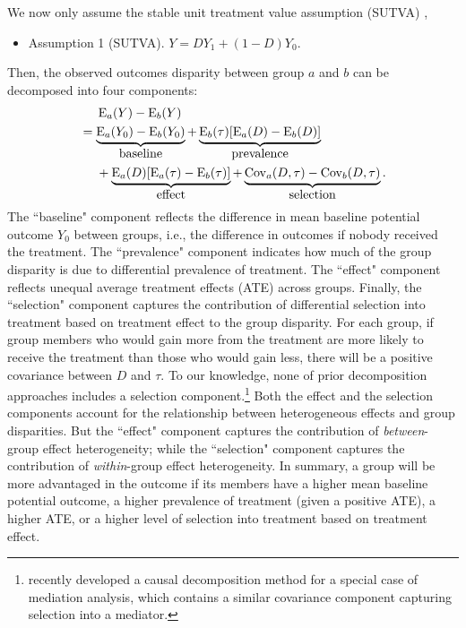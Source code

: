 \documentclass[12pt,a4paper]{article}
\newcommand{\Cov}{\operatorname{Cov}}
\newcommand{\E}{\operatorname{E}}
\begin{document}
We now only assume the stable unit treatment value assumption (SUTVA) \citep{rubin_randomization_1980}, 
\begin{itemize}
     \item[] Assumption 1 (SUTVA). $Y=D Y_1 + (1-D) Y_0$.
\end{itemize}
Then, the observed outcomes disparity between group $a$ and $b$ can be decomposed into four components: 
\begin{align}
&\phantom{{}={}} \E_a(Y)-\E_b(Y)   \nonumber  \\
&= \underbrace{ \E_a(Y_{0})-\E_b(Y_{0}) }_{\text{\normalsize baseline}}
+ \underbrace{\E_b(\tau) [\E_a(D)-\E_b(D)]}_{\text{\normalsize prevalence}} \nonumber  \\ 
&\phantom{{}={}} + \underbrace{\E_a(D)[ \E_a(\tau) - \E_b(\tau) ]}_{\text{\normalsize effect}} 
+ \underbrace{\Cov_a(D, \tau) -  \Cov_b(D, \tau)}_{\text{\normalsize  selection}}. \label{eqt1}
\end{align}
The ``baseline" component reflects the difference in mean baseline potential outcome $Y_0$ between groups, i.e., the difference in outcomes if nobody received the treatment. The ``prevalence" component indicates how much of the group disparity is due to differential prevalence of treatment. The ``effect" component reflects unequal average treatment effects (ATE) across groups. Finally, the ``selection" component captures the contribution of differential selection into treatment based on treatment effect to the group disparity. 
For each group, if group members who would gain more from the treatment are more likely to receive the treatment than those who would gain less, there will be a positive covariance between $D$ and $\tau$. To our knowledge, none of prior decomposition approaches includes a selection component.\footnote{\citet{zhou_attendance_2022} recently developed a causal decomposition method for a special case of mediation analysis, which contains a similar covariance component capturing selection into a mediator.} 
Both the effect and the selection components account for the relationship between heterogeneous effects and group disparities. But the ``effect" component captures the contribution of \emph{between}-group effect heterogeneity; while the ``selection" component captures the contribution of \emph{within}-group effect heterogeneity. In summary, a group will be more advantaged in the outcome if its members have a higher mean baseline potential outcome, a higher prevalence of treatment (given a positive ATE), a higher ATE, or a higher level of selection into treatment based on treatment effect.
\end{document}
